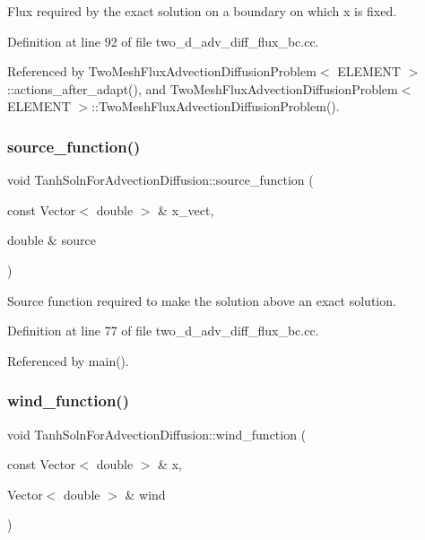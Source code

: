 Flux required by the exact solution on a boundary on which x is fixed. 



Definition at line 92 of file two\+\_\+d\+\_\+adv\+\_\+diff\+\_\+flux\+\_\+bc.\+cc.



Referenced by Two\+Mesh\+Flux\+Advection\+Diffusion\+Problem$<$ E\+L\+E\+M\+E\+N\+T $>$\+::actions\+\_\+after\+\_\+adapt(), and Two\+Mesh\+Flux\+Advection\+Diffusion\+Problem$<$ E\+L\+E\+M\+E\+N\+T $>$\+::\+Two\+Mesh\+Flux\+Advection\+Diffusion\+Problem().

\mbox{\label{namespaceTanhSolnForAdvectionDiffusion_aaa1aa95713b02b211812fdd18eeaa369}} 
\subsubsection{\texorpdfstring{source\+\_\+function()}{source\_function()}}
{\footnotesize\ttfamily void Tanh\+Soln\+For\+Advection\+Diffusion\+::source\+\_\+function (\begin{DoxyParamCaption}\item[{const Vector$<$ double $>$ \&}]{x\+\_\+vect,  }\item[{double \&}]{source }\end{DoxyParamCaption})}



Source function required to make the solution above an exact solution. 



Definition at line 77 of file two\+\_\+d\+\_\+adv\+\_\+diff\+\_\+flux\+\_\+bc.\+cc.



Referenced by main().

\mbox{\label{namespaceTanhSolnForAdvectionDiffusion_ab40e93031d34986762c69616c3c8b065}} 
\subsubsection{\texorpdfstring{wind\+\_\+function()}{wind\_function()}}
{\footnotesize\ttfamily void Tanh\+Soln\+For\+Advection\+Diffusion\+::wind\+\_\+function (\begin{DoxyParamCaption}\item[{const Vector$<$ double $>$ \&}]{x,  }\item[{Vector$<$ double $>$ \&}]{wind }\end{DoxyParamCaption})}



